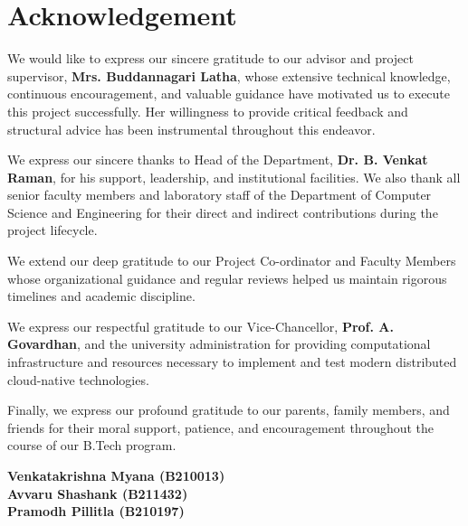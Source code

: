 \documentclass[12pt,a4paper]{report}
\begin{document}
\chapter*{Acknowledgement}

We would like to express our sincere gratitude to our advisor and project supervisor, \textbf{Mrs. Buddannagari Latha}, whose extensive technical knowledge, continuous encouragement, and valuable guidance have motivated us to execute this project successfully. Her willingness to provide critical feedback and structural advice has been instrumental throughout this endeavor.

\vspace{0.3cm}

We express our sincere thanks to Head of the Department, \textbf{Dr. B. Venkat Raman}, for his support, leadership, and institutional facilities. We also thank all senior faculty members and laboratory staff of the Department of Computer Science and Engineering for their direct and indirect contributions during the project lifecycle.

\vspace{0.3cm}

We extend our deep gratitude to our Project Co-ordinator and Faculty Members whose organizational guidance and regular reviews helped us maintain rigorous timelines and academic discipline.

\vspace{0.3cm}

We express our respectful gratitude to our Vice-Chancellor, \textbf{Prof. A. Govardhan}, and the university administration for providing computational infrastructure and resources necessary to implement and test modern distributed cloud-native technologies.

\vspace{0.3cm}

Finally, we express our profound gratitude to our parents, family members, and friends for their moral support, patience, and encouragement throughout the course of our B.Tech program.

\vspace{0.8cm}

\begin{flushright}
\textbf{Venkatakrishna Myana (B210013)}\\
\textbf{Avvaru Shashank (B211432)}\\
\textbf{Pramodh Pillitla (B210197)}
\end{flushright}
\clearpage
\end{document}
